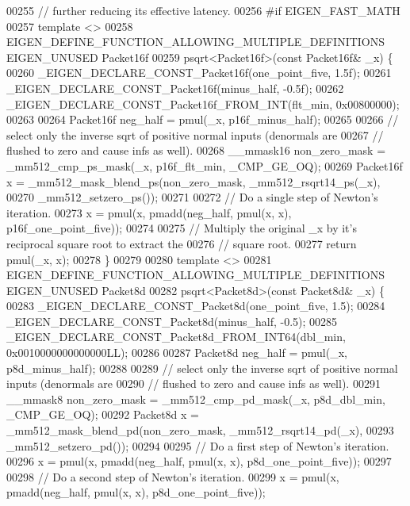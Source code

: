 \begin{DoxyCode}
00255 \textcolor{comment}{// further reducing its effective latency.}
00256 \textcolor{preprocessor}{#if EIGEN\_FAST\_MATH}
00257 \textcolor{keyword}{template} <>
00258 EIGEN\_DEFINE\_FUNCTION\_ALLOWING\_MULTIPLE\_DEFINITIONS EIGEN\_UNUSED Packet16f
00259 psqrt<Packet16f>(\textcolor{keyword}{const} Packet16f& \_x) \{
00260   \_EIGEN\_DECLARE\_CONST\_Packet16f(one\_point\_five, 1.5f);
00261   \_EIGEN\_DECLARE\_CONST\_Packet16f(minus\_half, -0.5f);
00262   \_EIGEN\_DECLARE\_CONST\_Packet16f\_FROM\_INT(flt\_min, 0x00800000);
00263 
00264   Packet16f neg\_half = pmul(\_x, p16f\_minus\_half);
00265 
00266   \textcolor{comment}{// select only the inverse sqrt of positive normal inputs (denormals are}
00267   \textcolor{comment}{// flushed to zero and cause infs as well).}
00268   \_\_mmask16 non\_zero\_mask = \_mm512\_cmp\_ps\_mask(\_x, p16f\_flt\_min, \_CMP\_GE\_OQ);
00269   Packet16f x = \_mm512\_mask\_blend\_ps(non\_zero\_mask, \_mm512\_rsqrt14\_ps(\_x),
00270                                      \_mm512\_setzero\_ps());
00271 
00272   \textcolor{comment}{// Do a single step of Newton's iteration.}
00273   x = pmul(x, pmadd(neg\_half, pmul(x, x), p16f\_one\_point\_five));
00274 
00275   \textcolor{comment}{// Multiply the original \_x by it's reciprocal square root to extract the}
00276   \textcolor{comment}{// square root.}
00277   \textcolor{keywordflow}{return} pmul(\_x, x);
00278 \}
00279 
00280 \textcolor{keyword}{template} <>
00281 EIGEN\_DEFINE\_FUNCTION\_ALLOWING\_MULTIPLE\_DEFINITIONS EIGEN\_UNUSED Packet8d
00282 psqrt<Packet8d>(\textcolor{keyword}{const} Packet8d& \_x) \{
00283   \_EIGEN\_DECLARE\_CONST\_Packet8d(one\_point\_five, 1.5);
00284   \_EIGEN\_DECLARE\_CONST\_Packet8d(minus\_half, -0.5);
00285   \_EIGEN\_DECLARE\_CONST\_Packet8d\_FROM\_INT64(dbl\_min, 0x0010000000000000LL);
00286 
00287   Packet8d neg\_half = pmul(\_x, p8d\_minus\_half);
00288 
00289   \textcolor{comment}{// select only the inverse sqrt of positive normal inputs (denormals are}
00290   \textcolor{comment}{// flushed to zero and cause infs as well).}
00291   \_\_mmask8 non\_zero\_mask = \_mm512\_cmp\_pd\_mask(\_x, p8d\_dbl\_min, \_CMP\_GE\_OQ);
00292   Packet8d x = \_mm512\_mask\_blend\_pd(non\_zero\_mask, \_mm512\_rsqrt14\_pd(\_x),
00293                                     \_mm512\_setzero\_pd());
00294 
00295   \textcolor{comment}{// Do a first step of Newton's iteration.}
00296   x = pmul(x, pmadd(neg\_half, pmul(x, x), p8d\_one\_point\_five));
00297 
00298   \textcolor{comment}{// Do a second step of Newton's iteration.}
00299   x = pmul(x, pmadd(neg\_half, pmul(x, x), p8d\_one\_point\_five));

\end{DoxyCode}
